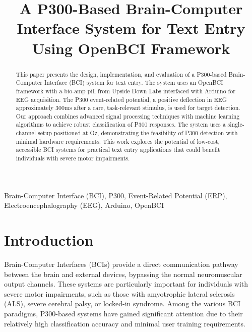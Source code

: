 \documentclass[conference]{IEEEtran}
\begin{document}
\title{A P300-Based Brain-Computer Interface System for Text Entry Using OpenBCI Framework}

\author{
}

\maketitle

\begin{abstract}
This paper presents the design, implementation, and evaluation of a P300-based Brain-Computer Interface (BCI) system for text entry. The system uses an OpenBCI framework with a bio-amp pill from Upside Down Labs interfaced with Arduino for EEG acquisition. The P300 event-related potential, a positive deflection in EEG approximately 300ms after a rare, task-relevant stimulus, is used for target detection. Our approach combines advanced signal processing techniques with machine learning algorithms to achieve robust classification of P300 responses. The system uses a single-channel setup positioned at Oz, demonstrating the feasibility of P300 detection with minimal hardware requirements. This work explores the potential of low-cost, accessible BCI systems for practical text entry applications that could benefit individuals with severe motor impairments.
\end{abstract}

\begin{IEEEkeywords}
Brain-Computer Interface (BCI), P300, Event-Related Potential (ERP), Electroencephalography (EEG), Arduino, OpenBCI
\end{IEEEkeywords}

\section{Introduction}
Brain-Computer Interfaces (BCIs) provide a direct communication pathway between the brain and external devices, bypassing the normal neuromuscular output channels. These systems are particularly important for individuals with severe motor impairments, such as those with amyotrophic lateral sclerosis (ALS), severe cerebral palsy, or locked-in syndrome. Among the various BCI paradigms, P300-based systems have gained significant attention due to their relatively high classification accuracy and minimal user training requirements.
\end{document}
